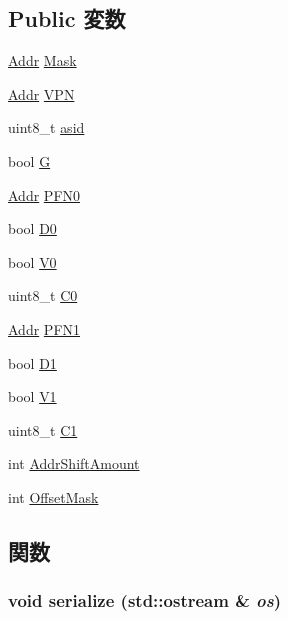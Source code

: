 \subsection*{Public 変数}
\begin{DoxyCompactItemize}
\item 
\hyperlink{base_2types_8hh_af1bb03d6a4ee096394a6749f0a169232}{Addr} \hyperlink{structPowerISA_1_1PTE_a55c80cc6dd4632d4322394ed691ac560}{Mask}
\item 
\hyperlink{base_2types_8hh_af1bb03d6a4ee096394a6749f0a169232}{Addr} \hyperlink{structPowerISA_1_1PTE_a828b555e1478c60407431dd9f779f208}{VPN}
\item 
uint8\_\-t \hyperlink{structPowerISA_1_1PTE_a79b438bb35263e6b3db98c5390a93516}{asid}
\item 
bool \hyperlink{structPowerISA_1_1PTE_adc50817b9a5196dce387a27280cf2c2c}{G}
\item 
\hyperlink{base_2types_8hh_af1bb03d6a4ee096394a6749f0a169232}{Addr} \hyperlink{structPowerISA_1_1PTE_ae07af9e304b40a172b73d912d81635a2}{PFN0}
\item 
bool \hyperlink{structPowerISA_1_1PTE_a5d65319c8ed6ef4b4c18547773a4ccf9}{D0}
\item 
bool \hyperlink{structPowerISA_1_1PTE_aef8a8ddc9558c9cff93b2610dddea958}{V0}
\item 
uint8\_\-t \hyperlink{structPowerISA_1_1PTE_a88317928f6b49bb03517258dd5fd5423}{C0}
\item 
\hyperlink{base_2types_8hh_af1bb03d6a4ee096394a6749f0a169232}{Addr} \hyperlink{structPowerISA_1_1PTE_ab1961d83479850fdb160aec644e973fc}{PFN1}
\item 
bool \hyperlink{structPowerISA_1_1PTE_ad13637cf05908806c978328c392d8edf}{D1}
\item 
bool \hyperlink{structPowerISA_1_1PTE_a2de020451ec6119f325bc89847d6f44a}{V1}
\item 
uint8\_\-t \hyperlink{structPowerISA_1_1PTE_a8286c9d870f31a089d95e6a2285fbe2f}{C1}
\item 
int \hyperlink{structPowerISA_1_1PTE_a2426034b7edbceda79a55a0ca28ac68e}{AddrShiftAmount}
\item 
int \hyperlink{structPowerISA_1_1PTE_aef54c305cf60db572e0a9248660ec0d3}{OffsetMask}
\end{DoxyCompactItemize}


\subsection{関数}
\hypertarget{structPowerISA_1_1PTE_a53e036786d17361be4c7320d39c99b84}{
\subsubsection[{serialize}]{\setlength{\rightskip}{0pt plus 5cm}void serialize (std::ostream \& {\em os})}}
\label{structPowerISA_1_1PTE_a53e036786d17361be4c7320d39c99b84}



